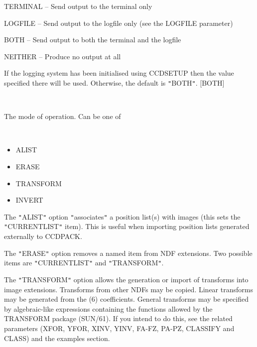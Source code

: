 \documentclass[twoside,11pt]{article}
\newcommand{\htmlref}[2]{#1}
\renewcommand{\_}{\texttt{\symbol{95}}}
\newcommand{\qt}[1]{{\tt "}#1{\tt "}}
\newcommand{\xroutine}[1]{\htmlref{{\sc #1}}{#1}}
\newcommand{\sstsubsection}[1]{ \item[{#1}] \mbox{} \\}
\newcommand{\sstitemlist}[1]{
  \mbox{} \\
  \vspace{-3.5ex}
  \begin{itemize}
     #1
  \end{itemize}
}
\newcommand{\sstitem}{\item}
\newcommand{\sstsubsection}[1]{\item[{#1}]}
\newcommand{\sstitemlist}[1]{
      \begin{itemize}
         #1
      \end{itemize}
      \\
   }
\newcommand{\sstitem}{\item}
\begin{document}
{{{{            \sstitem
               TERMINAL  -- Send output to the terminal only

            \sstitem
               LOGFILE   -- Send output to the logfile only (see the
                               LOGFILE parameter)

            \sstitem
               BOTH      -- Send output to both the terminal and the
                               logfile

            \sstitem
               NEITHER   -- Produce no output at all

         }
         If the logging system has been initialised using \xroutine{CCDSETUP}
         then the value specified there will be used. Otherwise, the
         default is \qt{BOTH}.
         [BOTH]
      }
      \sstsubsection{
         MODE = LITERAL (Read)
      }{
         The mode of operation. Can be one of
         \sstitemlist{

            \sstitem
               ALIST

            \sstitem
               ERASE

            \sstitem
               TRANSFORM

            \sstitem
               INVERT

         }
         The \qt{ALIST} option \qt{associates} a position list(s) with images
         (this sets the \qt{CURRENT\_LIST} item).  This is useful when
         importing position lists generated externally to CCDPACK.

         The \qt{ERASE} option removes a named item from NDF extensions.
         Two possible items are \qt{CURRENT\_LIST} and \qt{TRANSFORM}.

         The \qt{TRANSFORM} option allows the generation or import of
         transforms into image extensions. Transforms from other NDFs
         may be copied. Linear transforms may be generated from the (6)
         coefficients. General transforms may be specified by
         algebraic-like expressions containing the functions allowed by
         the TRANSFORM package (SUN/61). If you intend to do this, see
         the related parameters (XFOR, YFOR, XINV, YINV, FA-FZ, PA-PZ,
         CLASSIFY and CLASS) and the examples section.

}}}
\end{document}
